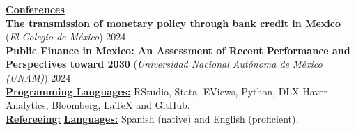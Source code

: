 \documentclass{article}
\begin{document}
\noindent \textbf{\underline{Conferences}} \\
\noindent \textbf{The transmission of monetary policy through bank credit in Mexico} (\textit{El Colegio de México}) 
\hfill 2024 \\
\noindent \textbf{Public Finance in Mexico: An Assessment of Recent Performance and Perspectives toward 2030} (\textit{Universidad Nacional Autónoma de México (UNAM)}) 
\hfill 2024 \\

%
%


\noindent \textbf{\underline{Programming Languages:}} 
\noindent RStudio, Stata, EViews, Python, DLX Haver Analytics, Bloomberg, \LaTeX{} and GitHub. \\
\noindent \textbf{\underline{Refereeing:}} 
\noindent \textbf{\underline{Languages:}} 
\noindent Spanish (native) and English (proficient). 

%
%
\end{document}

